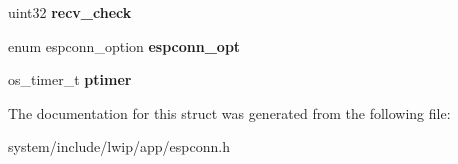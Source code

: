 \begin{DoxyCompactItemize}
\item 
\hypertarget{struct__comon__pkt_a4cde782f852afcbd14ced92990269cc0}{}uint32 {\bfseries recv\+\_\+check}\label{struct__comon__pkt_a4cde782f852afcbd14ced92990269cc0}

\item 
\hypertarget{struct__comon__pkt_ab9161f8c626c6cc3d3df00216b24f2eb}{}enum espconn\+\_\+option {\bfseries espconn\+\_\+opt}\label{struct__comon__pkt_ab9161f8c626c6cc3d3df00216b24f2eb}

\item 
\hypertarget{struct__comon__pkt_a342aa327161fb6c67c641be38ef058ed}{}os\+\_\+timer\+\_\+t {\bfseries ptimer}\label{struct__comon__pkt_a342aa327161fb6c67c641be38ef058ed}

\end{DoxyCompactItemize}


The documentation for this struct was generated from the following file\+:\begin{DoxyCompactItemize}
\item 
system/include/lwip/app/espconn.\+h\end{DoxyCompactItemize}
